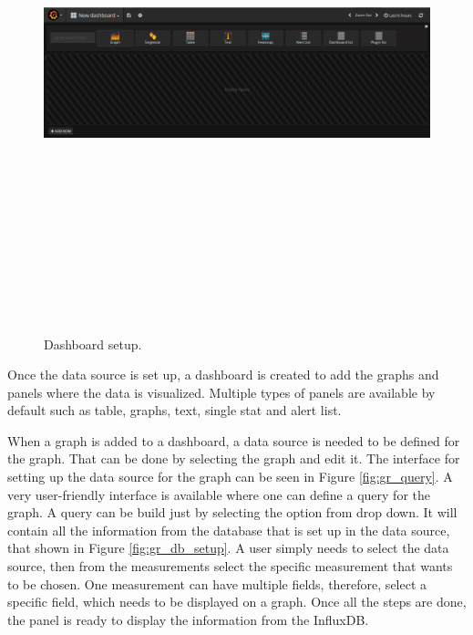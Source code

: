 \begin{figure}[htpb]
	\centering
	\includegraphics[width=16cm,height=15cm,keepaspectratio=true]{images/dashboard}
	\caption{
		Dashboard setup.
	}
	\label{fig:dashboard}
\end{figure}

Once the data source is set up, a dashboard is created to add the graphs and panels where the data is visualized. Multiple types of panels are available by default such as table, graphs, text, single stat and alert list.

When a graph is added to a dashboard, a data source is needed to be defined for the graph. That can be done by selecting the graph and edit it. The interface for setting up the data source for the graph can be seen in Figure \ref{fig:gr_query}. A very user-friendly interface is available where one can define a query for the graph. A query can be build just by selecting the option from drop down. It will contain all the information from the database that is set up in the data source, that shown in Figure \ref{fig:gr_db_setup}. A user simply needs to select the data source, then from the measurements select the specific measurement that wants to be chosen. One measurement can have multiple fields, therefore, select a specific field, which needs to be displayed on a graph. Once all the steps are done, the panel is ready to display the information from the InfluxDB.


